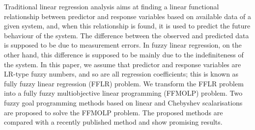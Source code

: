 
Traditional linear regression analysis aims at finding a linear functional relationship between predictor and response variables based on available data of a given system, and, when this relationship is found, it is used to predict the future behaviour of the system. The difference between the observed and predicted data is supposed to be due to measurement errors. In fuzzy linear regression, on the other hand, this difference is supposed to be mainly due to the indefiniteness of the system. In this paper, we assume that predictor and response variables are LR-type fuzzy numbers, and so are all regression coefficients; this is known as fully fuzzy linear regression (FFLR) problem. We transform the FFLR problem into a fully fuzzy multiobjective linear programming (FFMOLP) problem. Two fuzzy goal programming methods based on linear and Chebyshev scalarisations are proposed to solve the FFMOLP problem. The proposed methods are compared with a recently published method and show promising results.


